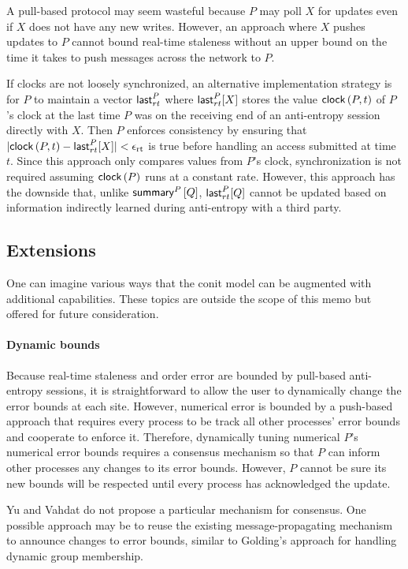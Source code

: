 \documentclass[]             %
{NASA}                       %
\theoremstyle{definition}
\begin{document}
A pull-based protocol may seem wasteful because $P$ may poll $X$ for
updates even if $X$ does not have any new writes. However, an approach
where $X$ pushes updates to $P$ cannot bound real-time staleness
without an upper bound on the time it takes to push messages across
the network to $P$.

If clocks are not loosely synchronized, an alternative implementation
strategy is for $P$ to maintain a vector $\mathsf{last}_{rt}^{P}{}$ where
$\mathsf{last}_{rt}^{P}[X]$ stores the value $\mathsf{clock}\left(P,t\right)$ of $P$'s clock at the
last time $P$ was on the receiving end of an anti-entropy session
directly with $X$. Then $P$ enforces consistency by ensuring that
$|\mathsf{clock}\left(P, t\right) - \mathsf{last}_{rt}^{P}{[X]}| < \epsilon_{\textrm{rt}}$ is true before handling an
access submitted at time $t$. Since this approach only compares values
from $P$'s clock, synchronization is not required assuming $\mathsf{clock}\left(P\right)$
runs at a constant rate. However, this approach has the downside that,
unlike $\mathsf{summary}^{P}\left[Q\right]$, $\mathsf{last}_{rt}^{P}[Q]$ cannot be updated based on
information indirectly learned during anti-entropy with a third
party.

\subsection{Extensions}
\label{ssec:conit-extensions}
One can imagine various ways that the conit model can be augmented
with additional capabilities. These topics are outside the scope of
this memo but offered for future consideration.

\paragraph{Dynamic bounds}
Because real-time staleness and order error are bounded by pull-based
anti-entropy sessions, it is straightforward to allow the user to
dynamically change the error bounds at each site. However, numerical
error is bounded by a push-based approach that requires every process
to be track all other processes' error bounds and cooperate to enforce
it. Therefore, dynamically tuning numerical $P$'s numerical error
bounds requires a consensus mechanism so that $P$ can inform other
processes any changes to its error bounds. However, $P$ cannot be sure
its new bounds will be respected until every process has acknowledged
the update.

Yu and Vahdat do not propose a particular mechanism for consensus. One
possible approach may be to reuse the existing message-propagating
mechanism to announce changes to error bounds, similar to Golding's
approach for handling dynamic group membership.
\end{document}
